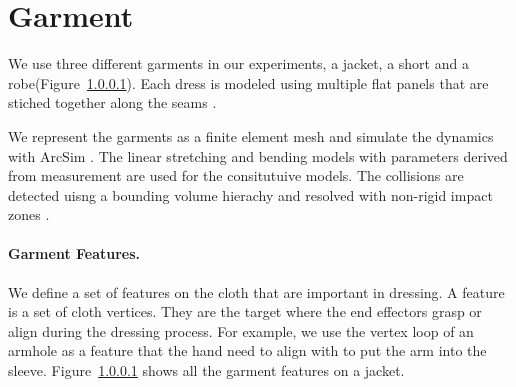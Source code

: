 \section{Garment}

We use three different garments in our experiments, a jacket, a short and a robe(Figure~\ref{}). Each dress is modeled using multiple flat panels that are stiched together along the seams \cite{}.

We represent the garments as a finite element mesh and simulate the dynamics with ArcSim \cite{}. The linear stretching and bending models with parameters derived from measurement \cite{} are used for the consitutuive models. The collisions are detected uisng a bounding volume hierachy \cite{} and resolved with non-rigid impact zones \cite{}.

\paragraph{Garment Features.} We define a set of features on the cloth that are important in dressing. A feature is a set of cloth vertices. They are the target where the end effectors grasp or align during the dressing process. For example, we use the vertex loop of an armhole as a feature that the hand need to align with to put the arm into the sleeve. Figure~\ref{} shows all the garment features on a jacket.
